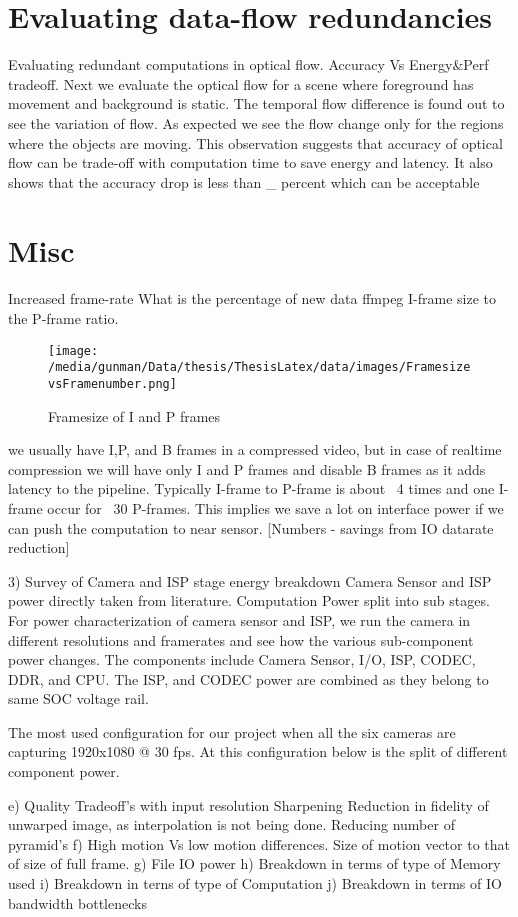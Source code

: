 \section{Evaluating data-flow redundancies}
Evaluating redundant computations in optical flow. 
Accuracy Vs Energy\&Perf tradeoff. 
Next we evaluate the optical flow for a scene where foreground has movement and background is static. The temporal flow difference is found out to see the variation of flow. As expected we see the flow change only for the regions where the objects are moving. This observation suggests that accuracy of optical flow can be trade-off with computation time to save energy and latency. It also shows that the accuracy drop is less than \_ percent which can be acceptable


\section{Misc}

	
Increased frame-rate\newline
What is the percentage of new data
ffmpeg I-frame size to the P-frame ratio.
\begin{figure*}
	\begin{center}
		\texttt{[image: /media/gunman/Data/thesis/ThesisLatex/data/images/FramesizevsFramenumber.png]}
		\caption{Framesize of I and P frames}
		\label{fig:ex_4_9}
	\end{center}
	\vspace{-0.3in}
\end{figure*} 
we usually have I,P, and B frames in a compressed video, but in case of realtime compression we will have only I and P frames and disable B frames as it adds latency to the pipeline. Typically I-frame to P-frame is about ~4 times and one I-frame occur for ~30 P-frames. This implies we save a lot on interface power if we can push the computation to near sensor.  
[Numbers - savings from IO datarate reduction]

3) Survey of Camera and ISP stage energy breakdown
Camera Sensor and ISP power directly taken from literature.
Computation Power split into sub stages. \newline
For power characterization of camera sensor and ISP, we run the camera in different resolutions and framerates and see how the various sub-component power changes. The components include Camera Sensor, I/O, ISP, CODEC, DDR, and CPU. The ISP, and CODEC power are combined as they belong to same SOC voltage rail.

The most used configuration for our project when all the six cameras are capturing 1920x1080 @ 30 fps. At this configuration below is the split of different component power. \newline


	e) Quality Tradeoff's with input resolution\newline
Sharpening
Reduction in fidelity of unwarped image, as interpolation is not being done.
Reducing number of pyramid's
f) High motion Vs low motion differences. Size of motion vector to that of size of full frame. 
g) File IO power
h) Breakdown in terms of type of Memory	used
i) Breakdown in terns of type of Computation
j) Breakdown in terms of IO bandwidth bottlenecks